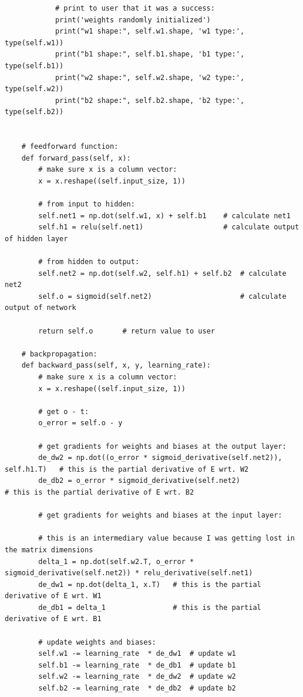 \documentclass[a4paper]{article}
\begin{document}
\begin{lstlisting}
            # print to user that it was a success:
            print('weights randomly initialized')
            print("w1 shape:", self.w1.shape, 'w1 type:', type(self.w1))
            print("b1 shape:", self.b1.shape, 'b1 type:', type(self.b1))
            print("w2 shape:", self.w2.shape, 'w2 type:', type(self.w2))
            print("b2 shape:", self.b2.shape, 'b2 type:', type(self.b2))


    # feedforward function:
    def forward_pass(self, x):
        # make sure x is a column vector:
        x = x.reshape((self.input_size, 1))

        # from input to hidden:
        self.net1 = np.dot(self.w1, x) + self.b1    # calculate net1
        self.h1 = relu(self.net1)                   # calculate output of hidden layer

        # from hidden to output:
        self.net2 = np.dot(self.w2, self.h1) + self.b2  # calculate net2
        self.o = sigmoid(self.net2)                     # calculate output of network

        return self.o       # return value to user
    
    # backpropagation:
    def backward_pass(self, x, y, learning_rate):
        # make sure x is a column vector:
        x = x.reshape((self.input_size, 1))

        # get o - t:
        o_error = self.o - y

        # get gradients for weights and biases at the output layer:
        de_dw2 = np.dot((o_error * sigmoid_derivative(self.net2)), self.h1.T)   # this is the partial derivative of E wrt. W2
        de_db2 = o_error * sigmoid_derivative(self.net2)                        # this is the partial derivative of E wrt. B2

        # get gradients for weights and biases at the input layer:

        # this is an intermediary value because I was getting lost in the matrix dimensions
        delta_1 = np.dot(self.w2.T, o_error * sigmoid_derivative(self.net2)) * relu_derivative(self.net1)  
        de_dw1 = np.dot(delta_1, x.T)   # this is the partial derivative of E wrt. W1
        de_db1 = delta_1                # this is the partial derivative of E wrt. B1

        # update weights and biases:
        self.w1 -= learning_rate  * de_dw1  # update w1
        self.b1 -= learning_rate  * de_db1  # update b1
        self.w2 -= learning_rate  * de_dw2  # update w2
        self.b2 -= learning_rate  * de_db2  # update b2


\end{lstlisting}
\end{document}
